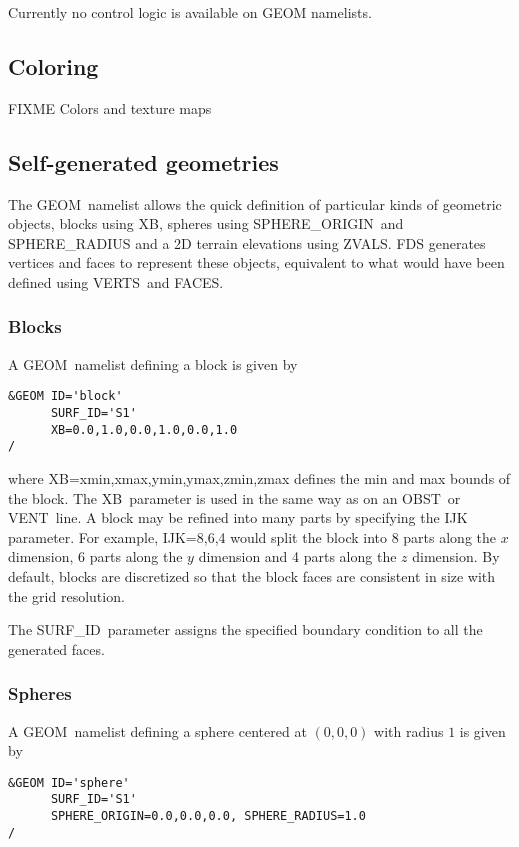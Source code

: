 \documentclass[12pt]{article}
\begin{document}
Currently no control logic is available on {\ct GEOM} namelists.

\subsection{Coloring}

FIXME Colors and texture maps

\subsection{Self-generated geometries}

The {\ct GEOM}\ namelist allows the quick definition of particular kinds of geometric objects, blocks using {\ct XB}, spheres using {\ct SPHERE\_ORIGIN}\ and {\ct SPHERE\_RADIUS}
and a 2D terrain elevations using {\ct ZVALS}. FDS generates vertices and faces to represent these objects, equivalent to what would have been defined using {\ct VERTS}\ and {\ct FACES}.

\subsubsection{Blocks}
A {\ct GEOM}\ namelist defining a block is given by

\begin{verbatim}
&GEOM ID='block'
      SURF_ID='S1'
      XB=0.0,1.0,0.0,1.0,0.0,1.0
/
\end{verbatim}

\noindent where {\ct XB=xmin,xmax,ymin,ymax,zmin,zmax} defines the min and max bounds of the block.
The {\ct XB}\ parameter is used in the same way as on an {\ct OBST}\ or {\ct VENT}\ line.
A block may be refined into many parts by specifying the {\ct IJK} parameter.
For example, {\ct IJK=8,6,4} would split the block into 8 parts along the $x$ dimension,
6 parts along the $y$ dimension and 4 parts along the $z$ dimension.
By default, blocks are discretized so that the block faces are consistent in size with the grid resolution.

The {\ct SURF\_ID}\ parameter assigns the specified boundary condition to all the generated faces.

\subsubsection{Spheres}
A {\ct GEOM}\ namelist defining a sphere centered at $(0,0,0)$ with radius $1$ is given by

\begin{verbatim}
&GEOM ID='sphere'
      SURF_ID='S1'
      SPHERE_ORIGIN=0.0,0.0,0.0, SPHERE_RADIUS=1.0
/
\end{verbatim}
\end{document}
